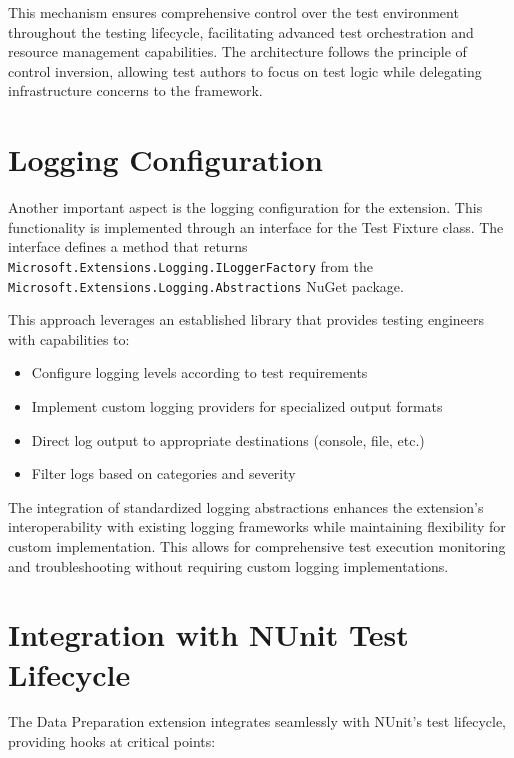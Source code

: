 This mechanism ensures comprehensive control over the test environment throughout the testing lifecycle, facilitating advanced test orchestration and resource management capabilities. The architecture follows the principle of control inversion, allowing test authors to focus on test logic while delegating infrastructure concerns to the framework.

\section{Logging Configuration}

Another important aspect is the logging configuration for the extension. This functionality is implemented through an interface for the Test Fixture class. The interface defines a method that returns \texttt{Microsoft.Extensions.Logging.ILoggerFactory} from the \texttt{Microsoft.Extensions.Logging.Abstractions} NuGet package.

This approach leverages an established library that provides testing engineers with capabilities to:

\begin{itemize}
    \item Configure logging levels according to test requirements
    \item Implement custom logging providers for specialized output formats
    \item Direct log output to appropriate destinations (console, file, etc.)
    \item Filter logs based on categories and severity
\end{itemize}

The integration of standardized logging abstractions enhances the extension's interoperability with existing logging frameworks while maintaining flexibility for custom implementation. This allows for comprehensive test execution monitoring and troubleshooting without requiring custom logging implementations.

\section{Integration with NUnit Test Lifecycle}

The Data Preparation extension integrates seamlessly with NUnit's test lifecycle, providing hooks at critical points:

